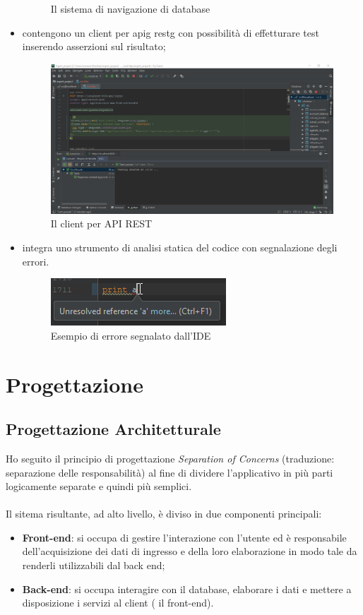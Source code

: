 \begin{itemize}
\begin{figure}[H]
			\caption{Il sistema di navigazione di database}
			\label{fig:ide-history}
		\end{figure}
	\item contengono un client per \gls{apig} \gls{restg} con possibilità di effetturare test inserendo asserzioni sul risultato;
		\begin{figure}[H]
			\centering
			\includegraphics[width=0.8\linewidth]{immagini/ide-rest}
			\caption{Il client per API REST}
			\label{fig:ide-history}
		\end{figure}
	\item integra uno strumento di analisi statica del codice con segnalazione degli errori.
		\begin{figure}[H]
			\centering
			\includegraphics[width=0.5\linewidth]{immagini/ide-error}
			\caption{Esempio di errore segnalato dall'IDE}
			\label{fig:ide-error}
		\end{figure}
	\end{itemize}

\section{Progettazione}
	\subsection{Progettazione Architetturale}
Ho seguito il principio di progettazione \emph{Separation of Concerns} (traduzione: separazione delle responsabilità) al fine di dividere l'applicativo in più parti logicamente separate e quindi più semplici. \\ \\
Il sitema risultante, ad alto livello, è diviso in due componenti principali:
	\begin{itemize}
		\item \textbf{Front-end}: si occupa di gestire l'interazione con l'utente ed è responsabile dell'acquisizione dei dati di ingresso e della loro elaborazione in modo tale da renderli utilizzabili dal back end;
		\item \textbf{Back-end}: si occupa interagire con il database, elaborare i dati e mettere a disposizione i servizi al client ( il front-end).
	\end{itemize}
	
